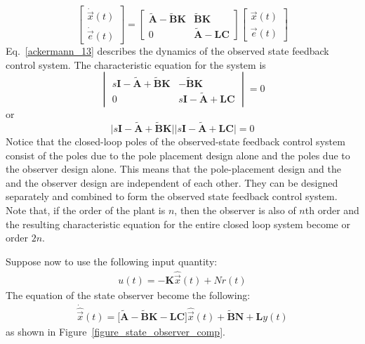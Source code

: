 \documentclass[11pt,a4paper,oneside]{book}
\numberwithin{equation}{section}
\theoremstyle{it}
\theoremstyle{definition}
\begin{document}
\begin{equation} \label{ackermann_13}
	\begin{bmatrix} 
		\dot{\vec x}(t) \\[6pt]
		\dot{\vec e}(t) 
	\end{bmatrix} =
	\begin{bmatrix}
		\tilde{\mathbf{A}}-\tilde{\mathbf{B}}\mathbf{K} & 
		\tilde{\mathbf{B}}\mathbf{K} \\[6pt]
		0 & \tilde{\mathbf{A}}-\mathbf{LC} 
	\end{bmatrix}
	\begin{bmatrix} 
		\vec x(t) \\[6pt]
		\vec e(t)
	\end{bmatrix}
\end{equation}
Eq.~\eqref{ackermann_13} describes the dynamics of the observed state feedback 
control system.
The characteristic equation for the system is
\begin{equation} 
	\begin{vmatrix}
		s\mathbf{I} -\tilde{\mathbf{A}}+\tilde{\mathbf{B}}\mathbf{K} & 
		-\tilde{\mathbf{B}}\mathbf{K} \\[6pt]
		0 & s\mathbf{I} - \tilde{\mathbf{A}}+\mathbf{LC} 
	\end{vmatrix} = 0
\end{equation}
or 
\begin{equation} 
	\Big|s\mathbf{I} -\tilde{\mathbf{A}}+\tilde{\mathbf{B}}\mathbf{K}\Big|\Big| 
	s\mathbf{I} - \tilde{\mathbf{A}}+\mathbf{LC}\Big| = 0
\end{equation}
Notice that the closed-loop poles of the observed-state feedback control system consist of the poles due to the pole placement design alone and the poles due to the observer design alone. This means that the pole-placement design and the and the observer design are independent of each other.
They can be designed separately and combined to form the observed state 
feedback control system. Note that, if the order of the plant is $n$, then the 
observer is also of $n$th order and the resulting characteristic equation for 
the entire closed loop system become or order $2n$.

Suppose now to use the following input quantity:
\begin{equation}
	\begin{split}
		u(t)=-\mathbf{K}\hat{\vec x}(t) + Nr(t)
	\end{split}
\end{equation} 
The equation of the state observer become the following:
\begin{equation}
	\begin{split}
		\dot{\hat{\vec x}}(t) = 
		\Big[\tilde{\mathbf{A}}-\tilde{\mathbf{B}}\mathbf{K}-\mathbf{LC}\Big] 
		\hat{\vec{x}}(t)+\tilde{\mathbf{B}}\mathbf{N}+\mathbf{L}y(t)
	\end{split}
\end{equation} 
as shown in Figure~\ref{figure_state_observer_comp}.
\end{document}
